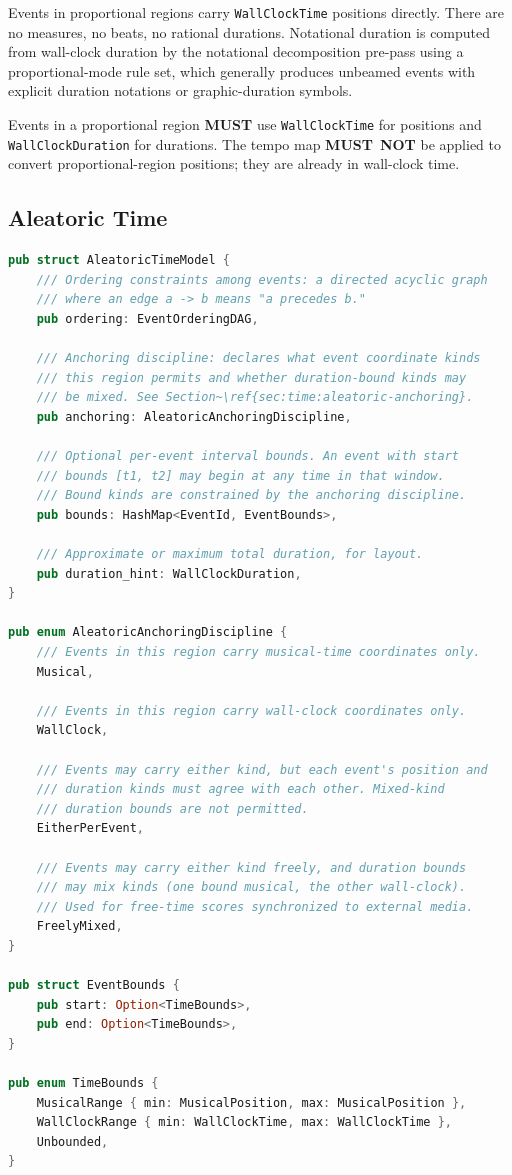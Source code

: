 \documentclass[11pt,letterpaper]{report}
\newcounter{requirement}[chapter]
\newcommand{\MUST}{\textbf{MUST}}
\newcommand{\MUSTNOT}{\textbf{MUST}\nobreak\ \textbf{NOT}}
\begin{document}
Events in proportional regions carry \texttt{WallClockTime} positions
directly. There are no measures, no beats, no rational durations.
Notational duration is computed from wall-clock duration by the
notational decomposition pre-pass using a proportional-mode rule set,
which generally produces unbeamed events with explicit duration
notations or graphic-duration symbols.

\begin{requirement}
  \label{req:time:proportional-region-time}
  Events in a proportional region \MUST{} use \texttt{WallClockTime}
  for positions and \texttt{WallClockDuration} for durations. The
  tempo map \MUSTNOT{} be applied to convert proportional-region
  positions; they are already in wall-clock time.
\end{requirement}

\subsection{Aleatoric Time}

\begin{lstlisting}[language=Rust]
pub struct AleatoricTimeModel {
    /// Ordering constraints among events: a directed acyclic graph
    /// where an edge a -> b means "a precedes b."
    pub ordering: EventOrderingDAG,

    /// Anchoring discipline: declares what event coordinate kinds
    /// this region permits and whether duration-bound kinds may
    /// be mixed. See Section~\ref{sec:time:aleatoric-anchoring}.
    pub anchoring: AleatoricAnchoringDiscipline,

    /// Optional per-event interval bounds. An event with start
    /// bounds [t1, t2] may begin at any time in that window.
    /// Bound kinds are constrained by the anchoring discipline.
    pub bounds: HashMap<EventId, EventBounds>,

    /// Approximate or maximum total duration, for layout.
    pub duration_hint: WallClockDuration,
}

pub enum AleatoricAnchoringDiscipline {
    /// Events in this region carry musical-time coordinates only.
    Musical,

    /// Events in this region carry wall-clock coordinates only.
    WallClock,

    /// Events may carry either kind, but each event's position and
    /// duration kinds must agree with each other. Mixed-kind
    /// duration bounds are not permitted.
    EitherPerEvent,

    /// Events may carry either kind freely, and duration bounds
    /// may mix kinds (one bound musical, the other wall-clock).
    /// Used for free-time scores synchronized to external media.
    FreelyMixed,
}

pub struct EventBounds {
    pub start: Option<TimeBounds>,
    pub end: Option<TimeBounds>,
}

pub enum TimeBounds {
    MusicalRange { min: MusicalPosition, max: MusicalPosition },
    WallClockRange { min: WallClockTime, max: WallClockTime },
    Unbounded,
}
\end{lstlisting}
\end{document}
